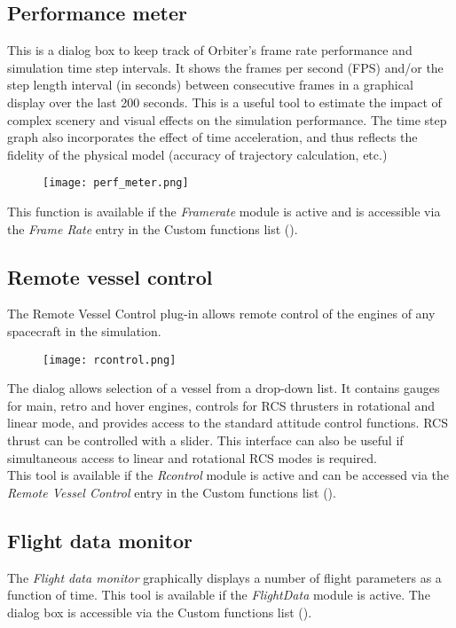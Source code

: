 \documentclass[Orbiter User Manual.tex]{subfiles}
\begin{document}
\subsection{Performance meter}
This is a dialog box to keep track of Orbiter's frame rate performance and simulation time step intervals. It shows the frames per second (FPS) and/or the step length interval (in seconds) between consecutive frames in a graphical display over the last 200 seconds. This is a useful tool to estimate the impact of complex scenery and visual effects on the simulation performance. The time step graph also incorporates the effect of time acceleration, and thus reflects the fidelity of the physical model (accuracy of trajectory calculation, etc.)

\begin{figure}[H]
	\centering
	\texttt{[image: perf\_meter.png]}
\end{figure}

\noindent
This function is available if the \textit{Framerate} module is active and is accessible via the \textit{Frame Rate} entry in the Custom functions list (\Ctrl{}).


\subsection{Remote vessel control}
The Remote Vessel Control plug-in allows remote control of the engines of any spacecraft in the simulation.

\begin{figure}[H]
	\centering
	\texttt{[image: rcontrol.png]}
\end{figure}

\noindent
The dialog allows selection of a vessel from a drop-down list. It contains gauges for main, retro and hover engines, controls for RCS thrusters in rotational and linear mode, and provides access to the standard attitude control functions. RCS thrust can be controlled with a slider. This interface can also be useful if simultaneous access to linear and rotational RCS modes is required.\\
This tool is available if the \textit{Rcontrol} module is active and can be accessed via the \textit{Remote Vessel Control} entry in the Custom functions list (\Ctrl{}).


\subsection{Flight data monitor}
The \textit{Flight data monitor} graphically displays a number of flight parameters as a function of time. This tool is available if the \textit{FlightData} module is active. The dialog box is accessible via the Custom functions list (\Ctrl{}).
\end{document}
